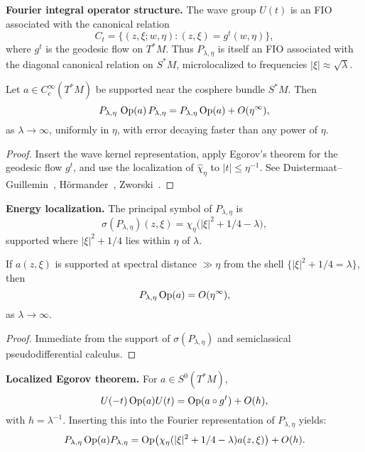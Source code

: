 \medskip
\noindent\textbf{Fourier integral operator structure.}
The wave group $U(t)$ is an FIO associated with the canonical relation
\[
  C_t = \{(z,\xi;w,\eta): (z,\xi)=g^t(w,\eta)\},
\]
where $g^t$ is the geodesic flow on $T^*M$.
Thus $P_{\lambda,\eta}$ is itself an FIO associated with the diagonal canonical relation
on $S^*M$, microlocalized to frequencies $|\xi|\approx \sqrt{\lambda}$.

\begin{lemma}\label{lem:microlocal-proj}
Let $a\in C_c^\infty(T^*M)$ be supported near the cosphere bundle $S^*M$.
Then
\[
  P_{\lambda,\eta}\,\operatorname{Op}(a)\,P_{\lambda,\eta}
   = P_{\lambda,\eta}\operatorname{Op}(a) + O(\eta^\infty),
\]
as $\lambda\to\infty$, uniformly in $\eta$, with error decaying faster than any power of $\eta$.
\end{lemma}

\begin{proof}
Insert the wave kernel representation, apply Egorov’s theorem for the geodesic flow $g^t$, 
and use the localization of $\widehat{\chi}_{\eta}$ to $|t|\le \eta^{-1}$.
See Duistermaat–Guillemin~\cite{DG1975}, Hörmander~\cite{HormanderPDO}, Zworski~\cite{Zworski2012}.
\end{proof}

\medskip
\noindent\textbf{Energy localization.}
The principal symbol of $P_{\lambda,\eta}$ is
\[
  \sigma(P_{\lambda,\eta})(z,\xi) =
  \chi_{\eta}\!\big(|\xi|^2+1/4-\lambda\big),
\]
supported where $|\xi|^2+1/4$ lies within $\eta$ of $\lambda$.

\begin{corollary}\label{cor:energy}
If $a(z,\xi)$ is supported at spectral distance $\gg \eta$ from the shell
$\{|\xi|^2+1/4=\lambda\}$, then
\[
  P_{\lambda,\eta}\operatorname{Op}(a)=O(\eta^\infty),
\]
as $\lambda\to\infty$.
\end{corollary}

\begin{proof}
Immediate from the support of $\sigma(P_{\lambda,\eta})$ and semiclassical
pseudodifferential calculus.
\end{proof}

\medskip
\noindent\textbf{Localized Egorov theorem.}
For $a\in S^0(T^*M)$,
\[
  U(-t)\operatorname{Op}(a)U(t)=\operatorname{Op}(a\circ g^t)+O(h),
\]
with $h=\lambda^{-1}$.
Inserting this into the Fourier representation of $P_{\lambda,\eta}$ yields:
\[
  P_{\lambda,\eta}\operatorname{Op}(a)P_{\lambda,\eta}
  = \operatorname{Op}\!\big(\chi_{\eta}(|\xi|^2+1/4-\lambda)a(z,\xi)\big) + O(h).
\]

